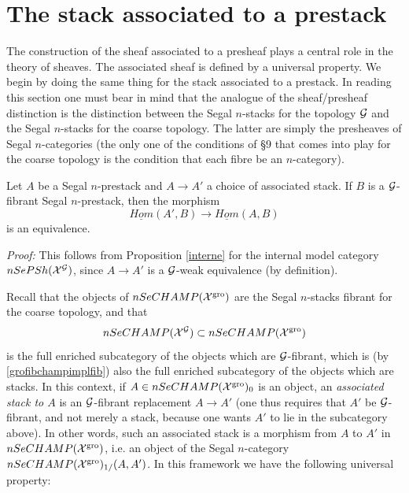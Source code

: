 %

\clearpage
\section{The stack associated to a prestack}
\label{associepage}

The construction of the sheaf associated to a presheaf plays a central role
in the theory of sheaves. The associated sheaf is defined by a universal
property. We begin by doing the same thing for the stack associated to a
prestack. In reading this section one must bear in mind that the analogue of
the sheaf/presheaf distinction is the distinction between the Segal
$n$-stacks for the topology ${\cal G}$ and the Segal $n$-stacks for the coarse
topology. The latter are simply the presheaves of Segal $n$-categories (the
only one of the conditions of \S9 that comes into play for the coarse
topology is the condition that each fibre be an $n$-category).

\begin{lemma}
\label{propuniv1}
Let $A$ be a Segal $n$-prestack and $A\rightarrow A'$ a choice of associated
stack. If $B$ is a ${\cal G}$-fibrant Segal $n$-prestack, then the morphism
$$
\underline{Hom}(A', B)\rightarrow \underline{Hom}(A,B)
$$
is an equivalence.
\end{lemma}
{\em Proof:} This follows from Proposition \ref{interne} for the internal
model category \newline
$nSePSh({\cal X} ^{{\cal G}})$, since
$A\rightarrow A'$ is a ${\cal G}$-weak equivalence (by definition).
\eop

Recall that the objects of $nSeCHAMP ({\cal X} ^{\rm gro})$
are the Segal $n$-stacks
fibrant for the coarse topology, and that
$$
nSeCHAMP ({\cal X} ^{{\cal G} })\subset nSeCHAMP ({\cal X} ^{\rm gro})
$$
is the full enriched subcategory of the objects which are ${\cal G}$-fibrant,
which is
(by \ref{grofibchampimplfib}) also the full enriched subcategory
of the objects
which are stacks. In this context,
if $A\in nSeCHAMP ({\cal X} ^{\rm gro})_0$ is an object,
an {\em associated stack to $A$} is an
${\cal G}$-fibrant replacement $A\rightarrow A'$ (one thus requires that $A'$ be
${\cal G}$-fibrant, and not merely a stack, because one wants $A'$ to lie in
the subcategory above).
In other words, such an associated stack
is a morphism from $A$ to $A'$ in
$nSeCHAMP ({\cal X} ^{\rm gro})$, i.e. an object of the Segal
$n$-category $nSeCHAMP ({\cal X} ^{\rm gro})_{1/}(A,A')$.
In this framework we have the following universal property:

